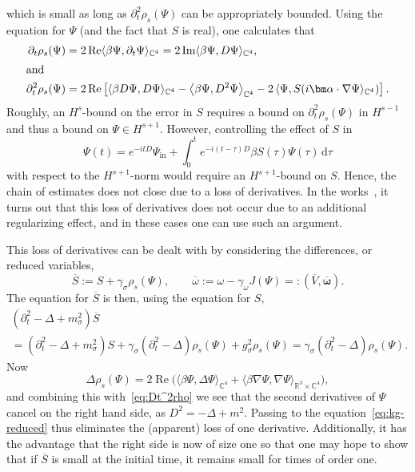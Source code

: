 \documentclass[10pt]{amsart}
\theoremstyle{definition}\newtheorem{defi}[theo]{Definition}\newtheorem{rema}[theo]{Remark}\newtheorem{exam}[theo]{Example}\newtheorem{exem}[theo]{Example}\newtheorem{nota}[theo]{Notation}
\DeclareMathOperator{\im}{Im}
\DeclareMathOperator{\re}{Re}
\newcommand{\rmin}{\mathrm{in}}
\newcommand\R{\mathbb{R}}
\newcommand\C{\mathbb{C}}
\renewcommand\bar{\overline}
\renewcommand\d[1]{{\ensuremath{\,\text{d}#1}}}
\begin{document}
which is small as long as $\partial_t^2\rho_s(\Psi)$ can be appropriately bounded. Using the equation for $\Psi$ (and the fact that $S$ is real), one calculates that
\begin{align}
\partial_t \rho_s(\Psi) &= 2\re\langle \beta\Psi,\partial_t\Psi\rangle_{\C^4} =2\im\langle \beta\Psi,D\Psi\rangle_{\C^4},
\\
\intertext{and}
\partial_t^2 \rho_s(\Psi) &=2\re\left[\langle\beta D\Psi,D\Psi\rangle_{\C^4}-\left\langle\beta\Psi,D^2\Psi\right\rangle_{\C^4}
-2\left\langle\Psi,S(i \bm \alpha\cdot\nabla
 \Psi\rangle_{\C^4}\right)\right].\label{eq:Dt^2rho}
\end{align}
Roughly, an $H^s$-bound on the error in $S$ requires a bound on $\partial_t^2 \rho_s(\Psi)$ in $H^{s-1}$ and thus a bound on $\Psi\in H^{s+1}$. However, controlling the effect of $S$ in
\begin{equation}\label{eq:PsiDuhamel}
\Psi(t)=e^{-itD}\Psi_\rmin+\int_0^te^{-i(t-\tau)D}{ \beta}S(\tau)\Psi(\tau)\d \tau
\end{equation}
with respect to the $H^{s+1}$-norm would require an $H^{s+1}$-bound on $S$. Hence, the chain of estimates does not close due to a loss of derivatives. In the works~\cite{baumstark2020,daub2016,griesemer2017}, it turns out that this loss of derivatives does not occur due to an additional regularizing effect, and in these cases one can use such an argument.

This loss of derivatives can be dealt with by considering the differences, or reduced variables,
\begin{equation}\label{eq:var-red}
\overline{S}:=S+\gamma_\sigma \rho_s(\Psi), \qquad \overline{\omega}:=\omega-\gamma_\omega J(\Psi)=:(\overline{V}, \overline{\bm \omega}).
\end{equation}
The equation for $\overline{S}$ is then, using the equation for $S$,
\begin{multline}\label{eq:kg-reduced}
\left(\partial_t^2-\Delta+m_\sigma^2\right)\bar{S}\\
=\left(\partial_t^2-\Delta+m_\sigma^2\right)S+\gamma_\sigma\left(\partial_t^2-\Delta\right)\rho_s(\Psi)+g_\sigma^2 \rho_s(\Psi)=\gamma_\sigma\left(\partial_t^2-\Delta\right)\rho_s(\Psi).
\end{multline}
Now
\begin{equation}
\Delta \rho_s(\Psi) = 2\re \big(\langle \beta \Psi, \Delta \Psi \rangle_{\C^4} + \langle \beta \nabla\Psi, \nabla \Psi \rangle_{\R^3\times \C^4}\big),
\end{equation}
and combining this with~\eqref{eq:Dt^2rho} we see that the second derivatives of $\Psi$ cancel on the right hand side, as $D^2=-\Delta+m^2$. Passing to the equation~\eqref{eq:kg-reduced} thus eliminates the (apparent) loss of one derivative. Additionally, it has the advantage that the right side is now of size one so that one may hope to show that if $\bar{S}$ is small at the initial time, it remains small for times of order one.
\end{document}
